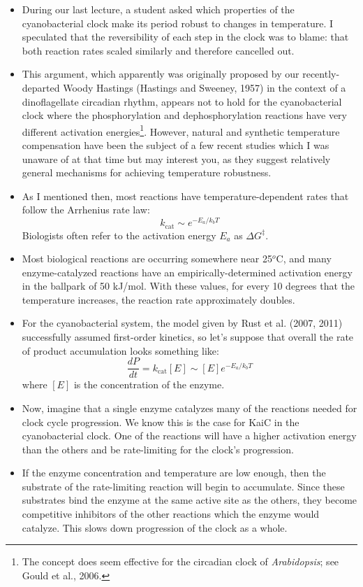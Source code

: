 \documentclass{article}
\begin{document}
\begin{itemize}
\item During our last lecture, a student asked which properties of the cyanobacterial clock make its period robust to changes in temperature. I speculated that the reversibility of each step in the clock was to blame: that both reaction rates scaled similarly and therefore cancelled out.
\item This argument, which apparently was originally proposed by our recently-departed Woody Hastings (Hastings and Sweeney, 1957) in the context of a dinoflagellate circadian rhythm, appears not to hold for the cyanobacterial clock where the phosphorylation and dephosphorylation reactions have very different activation energies\footnote{The concept does seem effective for the circadian clock of \textit{Arabidopsis}; see Gould et al., 2006.}. However, natural and synthetic temperature compensation have been the subject of a few recent studies which I was unaware of at that time but may interest you, as they suggest relatively general mechanisms for achieving temperature robustness.
\item As I mentioned then, most reactions have temperature-dependent rates that follow the Arrhenius rate law:
\[ k_{\textrm{cat}} \sim e^{-E_a / k_bT} \]
Biologists often refer to the activation energy $E_a$ as $\Delta G^{\ddag}$.
\item Most biological reactions are occurring somewhere near 25$^o$C, and many enzyme-catalyzed reactions have an empirically-determined activation energy in the ballpark of 50 kJ/mol. With these values, for every 10 degrees that the temperature increases, the reaction rate approximately doubles.
\item For the cyanobacterial system, the model given by Rust et al. (2007, 2011) successfully assumed first-order kinetics, so let's suppose that overall the rate of product accumulation looks something like:
\[ \frac{dP}{dt} = k_{\textrm{cat}} \left[ E \right] \sim \left[ E \right] e^{-E_a / k_bT} \]
where $[E]$ is the concentration of the enzyme.
\item Now, imagine that a single enzyme catalyzes many of the reactions needed for clock cycle progression. We know this is the case for KaiC in the cyanobacterial clock. One of the reactions will have a higher activation energy than the others and be rate-limiting for the clock's progression.
\item If the enzyme concentration and temperature are low enough, then the substrate of the rate-limiting reaction will begin to accumulate. Since these substrates bind the enzyme at the same active site as the others, they become competitive inhibitors of the other reactions which the enzyme would catalyze. This slows down progression of the clock as a whole.

\end{itemize}
\end{document}
